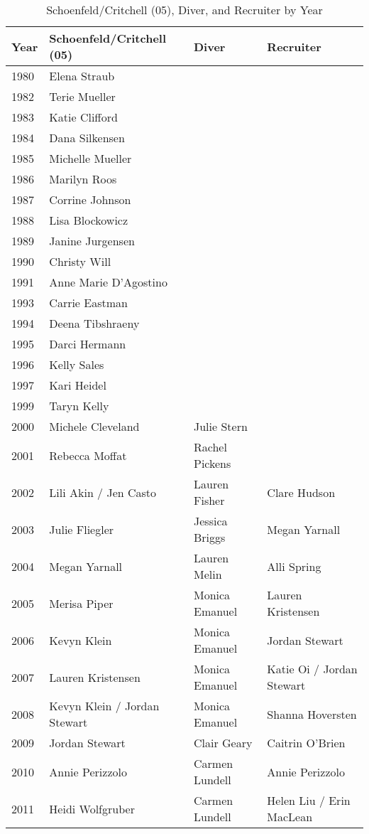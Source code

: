 \begin{table}[htbp]
\centering
\caption*{Schoenfeld/Critchell (05), Diver, and Recruiter by Year}
\scriptsize
\begin{tabular}{llll}
\toprule
Year & Schoenfeld/Critchell (05) & Diver & Recruiter \\
\midrule
1980 & Elena Straub & & \\
1982 & Terie Mueller & & \\
1983 & Katie Clifford & & \\
1984 & Dana Silkensen & & \\
1985 & Michelle Mueller & & \\
1986 & Marilyn Roos & & \\
1987 & Corrine Johnson & & \\
1988 & Lisa Blockowicz & & \\
1989 & Janine Jurgensen & & \\
1990 & Christy Will & & \\
1991 & Anne Marie D'Agostino & & \\
1993 & Carrie Eastman & & \\
1994 & Deena Tibshraeny & & \\
1995 & Darci Hermann & & \\
1996 & Kelly Sales & & \\
1997 & Kari Heidel & & \\
1999 & Taryn Kelly & & \\
2000 & Michele Cleveland & Julie Stern & \\
2001 & Rebecca Moffat & Rachel Pickens & \\
2002 & Lili Akin / Jen Casto & Lauren Fisher & Clare Hudson \\
2003 & Julie Fliegler & Jessica Briggs & Megan Yarnall \\
2004 & Megan Yarnall & Lauren Melin & Alli Spring \\
2005 & Merisa Piper & Monica Emanuel & Lauren Kristensen \\
2006 & Kevyn Klein & Monica Emanuel & Jordan Stewart \\
2007 & Lauren Kristensen & Monica Emanuel & Katie Oi / Jordan Stewart \\
2008 & Kevyn Klein / Jordan Stewart & Monica Emanuel & Shanna Hoversten \\
2009 & Jordan Stewart & Clair Geary & Caitrin O'Brien \\
2010 & Annie Perizzolo & Carmen Lundell & Annie Perizzolo \\
2011 & Heidi Wolfgruber & Carmen Lundell & Helen Liu / Erin MacLean \\

\end{tabular}
\end{table}
